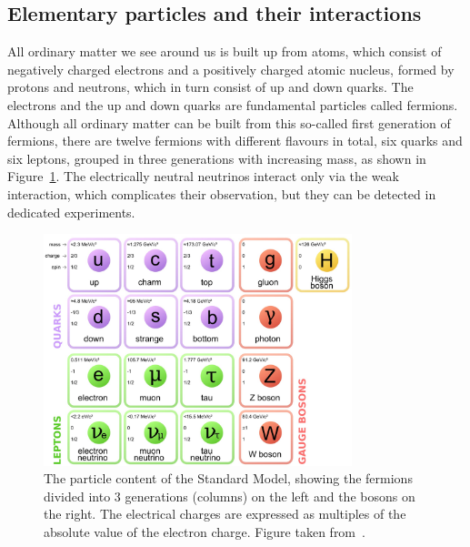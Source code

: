 \subsection{Elementary particles and their interactions}

All ordinary matter we see around us is built up from atoms, which consist of negatively charged electrons and a positively charged atomic nucleus, formed by protons and neutrons, which in turn consist of up and down quarks. The electrons and the up and down quarks are fundamental particles called fermions. Although all ordinary matter can be built from this so-called first generation of fermions, there are twelve fermions with different flavours in total, six quarks and six leptons, grouped in three generations with increasing mass, as shown in Figure~\ref{fig:SM}. The electrically neutral neutrinos interact only via the weak interaction, which complicates their observation, but they can be detected in dedicated experiments.

\begin{figure}[ht]
  \centering
  \includegraphics[width=0.8\textwidth]{SM.jpg}\hfill%
  \caption{The particle content of the Standard Model, showing the fermions divided into 3 generations (columns) on the left and the bosons on the right. The electrical charges are expressed as multiples of the absolute value of the electron charge. Figure taken from~\cite{quantumdiaries}.}
  \label{fig:SM}
\end{figure}

